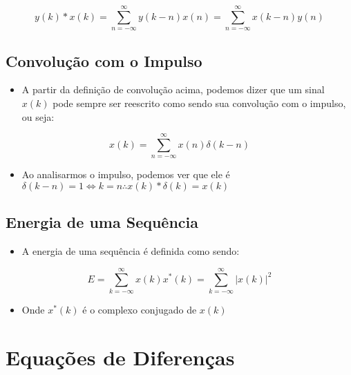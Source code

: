 \documentclass[]{article}
\providecommand{\tightlist}{%
  \setlength{\itemsep}{0pt}\setlength{\parskip}{0pt}}
\begin{document}
  \[
  y(k) *x(k) = \sum^{\infty}_{n = -\infty} y(k - n)x(n)=\sum^{\infty}_{n = -\infty} x(k - n)y(n)
  \]

  \hypertarget{convoluuxe7uxe3o-com-o-impulso}{%
  \subsection{Convolução com o
  Impulso}\label{convoluuxe7uxe3o-com-o-impulso}}

  \begin{itemize}
  \tightlist
  \item
    A partir da definição de convolução acima, podemos dizer que um sinal
    \(x(k)\) pode sempre ser reescrito como sendo sua convolução com o
    impulso, ou seja:
  \end{itemize}

  \[
  x(k) = \sum^{\infty}_{n = -\infty} x(n) \delta(k-n)
  \]

  \begin{itemize}
  \tightlist
  \item
    Ao analisarmos o impulso, podemos ver que ele é
    \(\delta (k - n) = 1 \iff k = n \therefore x(k)*\delta(k) = x(k)\)
  \end{itemize}

  \hypertarget{energia-de-uma-sequuxeancia}{%
  \subsection{Energia de uma
  Sequência}\label{energia-de-uma-sequuxeancia}}

  \begin{itemize}
  \tightlist
  \item
    A energia de uma sequência é definida como sendo:
  \end{itemize}

  \[
  E = \sum^{\infty}_{k=-\infty} x(k)x^* (k) = \sum^{\infty}_{k=-\infty} |x(k)|^2
  \]

  \begin{itemize}
  \tightlist
  \item
    Onde \(x^*(k)\) é o complexo conjugado de \(x(k)\)
  \end{itemize}

  \hypertarget{equauxe7uxf5es-de-diferenuxe7as}{%
  \section{Equações de Diferenças}\label{equauxe7uxf5es-de-diferenuxe7as}}
\end{document}
